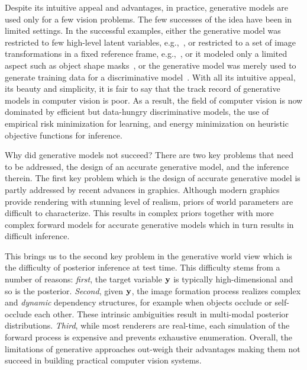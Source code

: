 Despite its intuitive appeal and advantages,
in practice, generative models are used only for a few vision problems.
The few successes of the idea have been in limited settings.
In the successful examples, either
the generative model was restricted to few high-level latent
variables, e.g.,~\cite{oliver2000humaninteractions},
or restricted to a set of image transformations in a fixed reference
frame, e.g.,~\cite{black2000imageappearance},
or it modeled only a limited aspect such as
object shape masks~\cite{eslami2012shapeboltzmann},
or the generative model was merely used to generate
training data for a discriminative model~\cite{shotton2011kinect,gaidon2016virtual,
ros2016synthia,richter2016playing,shafaei2016play}.
%
With all its intuitive appeal, its beauty and simplicity, it is fair to say
that the track record of generative models in computer vision is poor.
%
As a result, the field of computer vision is now dominated by
efficient but data-hungry discriminative models,
the use of empirical risk minimization for learning,
and energy minimization on heuristic objective functions for inference.

Why did generative models not succeed? There are two key problems that
need to be addressed, the design of an accurate generative model, and
the inference therein.
The first key problem which is the design of accurate generative model is partly
addressed by recent advances in graphics. Although modern graphics provide
rendering with stunning level of realism, priors of world parameters are difficult
to characterize. This results in complex priors together with more complex
forward models for accurate generative models which in turn results in
difficult inference.

This brings us to the second key problem in the generative world view which is
the difficulty of posterior inference at test time.
%
This difficulty stems from a number of reasons:
\emph{first}, the target variable $\mathbf{y}$ is typically high-dimensional and so is
the posterior.
%
\emph{Second}, given $\mathbf{y}$, the image formation process realizes complex and
\emph{dynamic} dependency structures, for example when objects occlude or
self-occlude each other. These intrinsic ambiguities result in multi-modal
posterior distributions.
%
\emph{Third}, while most renderers are real-time, each simulation of the
forward process is expensive and prevents exhaustive enumeration. Overall,
the limitations of generative approaches out-weigh their advantages making
them not succeed in building practical computer vision systems.

